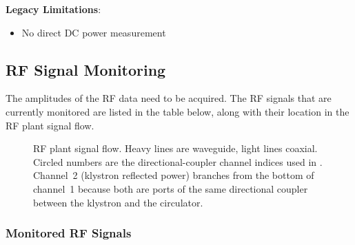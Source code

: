 {\textbf{Legacy Limitations}:

\begin{itemize}
\tightlist
\item
  No direct DC power measurement
\end{itemize}

\subsection{RF Signal Monitoring}\label{rf-signal-monitoring}

The amplitudes of the RF data need to be acquired. The RF signals that are currently monitored are listed in the table below, along with their location in the RF plant signal flow.

\begin{figure}[tbp]
\centering
\resizebox{0.82\linewidth}{!}{}
\caption{RF plant signal flow.  Heavy lines are waveguide, light lines coaxial.  Circled numbers are the directional-coupler channel indices used in .  Channel~2 (klystron reflected power) branches from the bottom of channel~1 because both are ports of the same directional coupler between the klystron and the circulator.}\label{fig:rf-signal-flow}
\end{figure}
\subsubsection{Monitored RF Signals}\label{monitored-rf-signals}

}
